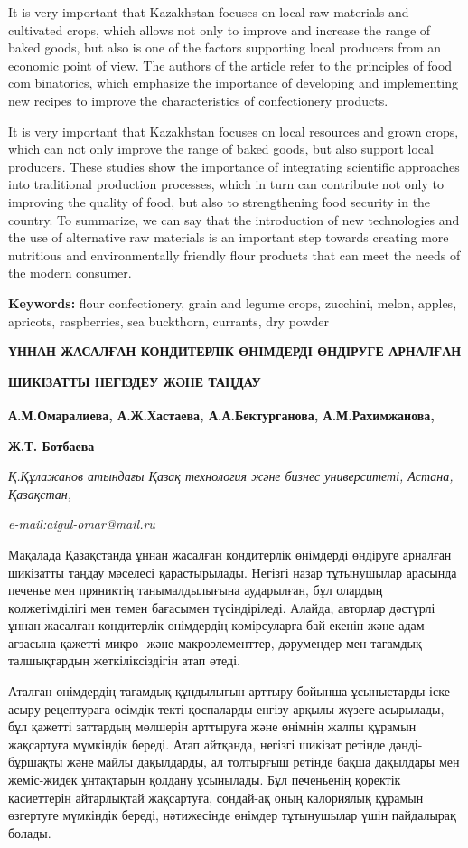 It is very important that Kazakhstan focuses on local raw materials and
cultivated crops, which allows not only to improve and increase the
range of baked goods, but also is one of the factors supporting local
producers from an economic point of view. The authors of the article
refer to the principles of food com binatorics, which emphasize the
importance of developing and implementing new recipes to improve the
characteristics of confectionery products.

It is very important that Kazakhstan focuses on local resources and
grown crops, which can not only improve the range of baked goods, but
also support local producers. These studies show the importance of
integrating scientific approaches into traditional production processes,
which in turn can contribute not only to improving the quality of food,
but also to strengthening food security in the country. To summarize, we
can say that the introduction of new technologies and the use of
alternative raw materials is an important step towards creating more
nutritious and environmentally friendly flour products that can meet the
needs of the modern consumer.

{\bfseries Keywords:} flour confectionery, grain and legume crops,
zucchini, melon, apples, apricots, raspberries, sea buckthorn, currants,
dry powder

{\bfseries ҰННАН ЖАСАЛҒАН КОНДИТЕРЛІК ӨНІМДЕРДІ ӨНДІРУГЕ АРНАЛҒАН}

{\bfseries ШИКІЗАТТЫ НЕГІЗДЕУ ЖӘНЕ ТАҢДАУ}

{\bfseries А.М.Омаралиева\textsuperscript{\envelope }, А.Ж.Хастаева,
А.А.Бектурганова, А.М.Рахимжанова,}

{\bfseries Ж.Т. Ботбаева}

\emph{Қ.Құлажанов атындағы Қазақ технология және бизнес университеті,
Астана, Қазақстан,}

\emph{e-mail:aigul-omar@mail.ru}

Мақалада Қазақстанда ұннан жасалған кондитерлік өнімдерді өндіруге
арналған шикізатты таңдау мәселесі қарастырылады. Негізгі назар
тұтынушылар арасында печенье мен пряниктің танымалдылығына аударылған,
бұл олардың қолжетімділігі мен төмен бағасымен түсіндіріледі. Алайда,
авторлар дәстүрлі ұннан жасалған кондитерлік өнімдердің көмірсуларға бай
екенін және адам ағзасына қажетті микро- және макроэлементтер,
дәрумендер мен тағамдық талшықтардың жеткіліксіздігін атап өтеді.

Аталған өнімдердің тағамдық құндылығын арттыру бойынша ұсыныстарды іске
асыру рецептураға өсімдік текті қоспаларды енгізу арқылы жүзеге
асырылады, бұл қажетті заттардың мөлшерін арттыруға және өнімнің жалпы
құрамын жақсартуға мүмкіндік береді. Атап айтқанда, негізгі шикізат
ретінде дәнді-бұршақты және майлы дақылдарды, ал толтырғыш ретінде бақша
дақылдары мен жеміс-жидек ұнтақтарын қолдану ұсынылады. Бұл печеньенің
қоректік қасиеттерін айтарлықтай жақсартуға, сондай-ақ оның калориялық
құрамын өзгертуге мүмкіндік береді, нәтижесінде өнімдер тұтынушылар үшін
пайдалырақ болады.

